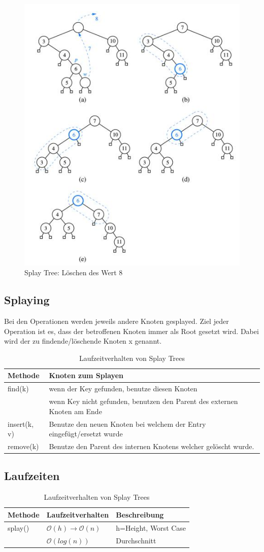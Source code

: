 \begin{figure}[h!]
	\centering
	\includegraphics[width=0.5\linewidth]{images/splay_trees_remove}
	\caption{Splay Tree: Löschen des Wert 8}
	\label{fig:splaytreesremove}
\end{figure}

\newpage


\subsection{Splaying}
Bei den Operationen werden jeweils andere Knoten gesplayed. Ziel jeder Operation ist es, dass der betroffenen Knoten immer als Root gesetzt wird. Dabei wird der zu findende/löschende Knoten x genannt.
\begin{table}[h!]
	\centering
	\begin{tabu} to \linewidth {l l}
		\toprule
		Methode & Knoten zum Splayen \\
		\midrule
		find(k) & wenn der Key gefunden, benutze diesen Knoten \\
		 & wenn Key nicht gefunden, benutzen den Parent des externen Knoten am Ende \\
		 insert(k, v) & Benutze den neuen Knoten bei welchem der Entry eingefügt/ersetzt wurde \\
		 remove(k) & Benutze den Parent des internen Knotens welcher gelöscht wurde. \\
		\bottomrule
	\end{tabu}
	\caption{Laufzeitverhalten von Splay Trees}
\end{table}


\subsection{Laufzeiten}
\begin{table}[h!]
\centering
	\begin{tabu} to \linewidth {l l l}
	\toprule
	Methode & Laufzeitverhalten  & Beschreibung\\
	\midrule
	splay() & $\mathcal{O}(h) \rightarrow \mathcal{O}(n)$  & h=Height, Worst Case \\
	 & $\mathcal{O}(log(n))$ & Durchschnitt\\
	\bottomrule
	\end{tabu}
	\caption{Laufzeitverhalten von Splay Trees}
\end{table}

